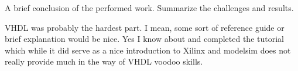A brief conclusion of the performed work.
Summarize the challenges and results.


VHDL was probably the hardest part. I mean, some sort of reference guide or brief explanation would be nice. Yes I know about and completed the tutorial which while it did serve as a nice introduction to Xilinx and modelsim does not really provide much in the way of VHDL voodoo skills.